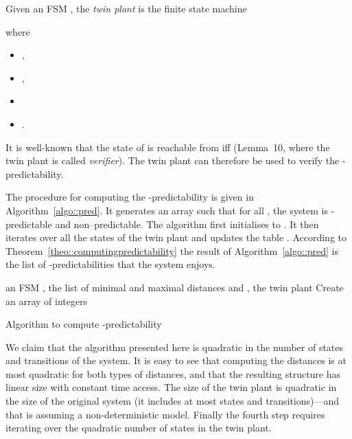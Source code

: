 \documentclass{article}
\begin{document}
  Given an FSM , 
  the \emph{twin plant} is the finite state machine 
   
  where 
  \begin{itemize}
  \item 
    , 
  \item 
    , 
  \item 
    

    
  \item 
    .  
  \end{itemize}

It is well-known that the state  of  
is reachable from  iff  
(Lemma~10, \cite{genc-lafortune::automatica::09} 
where the twin plant is called \emph{verifier}).  
The twin plant can therefore be used to verify the -predictability.  

The procedure for computing the -predictability 
is given in Algorithm~\ref{algo::pred}.  
It generates an array  such that for all , 
the system is -predictable and non--predictable.  
The algorithm first initialises  to .  
It then iterates over all the states of the twin plant 
and updates the table .  
According to Theorem~\ref{theo::computingpredictability} 
the result of Algorithm~\ref{algo::pred} 
is the list of -predictabilities that the system enjoys.  

\begin{algorithm}
  \begin{algorithmic}[1]
     an FSM , 
    the list of minimal and maximal distances  and , 
    the twin plant 
    \STATE Create an array of integers 
    \FORALL{}
        \STATE 
    \ENDFOR
    \FORALL{}
    \STATE 
    \STATE 
      \STATE \label{line::ss->notpred}
    \ENDFOR
  \end{algorithmic}
  \caption{Algorithm to compute -predictability}
  \label{algo::pred}
\end{algorithm}

We claim that the algorithm presented here is quadratic 
in the number of states and transitions of the system.  
It is easy to see that computing the distances 
is at most quadratic for both types of distances, 
and that the resulting structure has linear size 
with constant time access.  
The size of the twin plant is quadratic 
in the size of the original system 
(it includes at most  states 
and  transitions)---and that is assuming a non-deterministic model. 
Finally the fourth step 
requires iterating over the quadratic number of states in the twin plant.  
\end{document}
